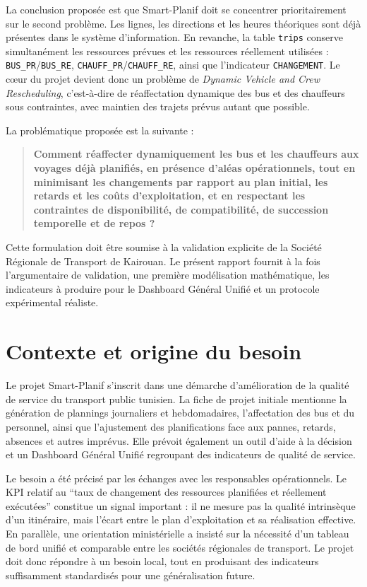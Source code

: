 \documentclass[12pt,a4paper]{article}
\newcommand{\code}[1]{\texttt{#1}}
\begin{document}
La conclusion proposée est que Smart-Planif doit se concentrer prioritairement sur le second problème. Les lignes, les directions et les heures théoriques sont déjà présentes dans le système d’information. En revanche, la table \code{trips} conserve simultanément les ressources prévues et les ressources réellement utilisées : \code{BUS\_PR}/\code{BUS\_RE}, \code{CHAUFF\_PR}/\code{CHAUFF\_RE}, ainsi que l’indicateur \code{CHANGEMENT}. Le cœur du projet devient donc un problème de \emph{Dynamic Vehicle and Crew Rescheduling}, c’est-à-dire de réaffectation dynamique des bus et des chauffeurs sous contraintes, avec maintien des trajets prévus autant que possible.

La problématique proposée est la suivante :

\begin{quote}
\textbf{Comment réaffecter dynamiquement les bus et les chauffeurs aux voyages déjà planifiés, en présence d’aléas opérationnels, tout en minimisant les changements par rapport au plan initial, les retards et les coûts d’exploitation, et en respectant les contraintes de disponibilité, de compatibilité, de succession temporelle et de repos ?}
\end{quote}

Cette formulation doit être soumise à la validation explicite de la Société Régionale de Transport de Kairouan. Le présent rapport fournit à la fois l’argumentaire de validation, une première modélisation mathématique, les indicateurs à produire pour le Dashboard Général Unifié et un protocole expérimental réaliste.

\section{Contexte et origine du besoin}

Le projet Smart-Planif s’inscrit dans une démarche d’amélioration de la qualité de service du transport public tunisien. La fiche de projet initiale mentionne la génération de plannings journaliers et hebdomadaires, l’affectation des bus et du personnel, ainsi que l’ajustement des planifications face aux pannes, retards, absences et autres imprévus. Elle prévoit également un outil d’aide à la décision et un Dashboard Général Unifié regroupant des indicateurs de qualité de service.

Le besoin a été précisé par les échanges avec les responsables opérationnels. Le KPI relatif au \enquote{taux de changement des ressources planifiées et réellement exécutées} constitue un signal important : il ne mesure pas la qualité intrinsèque d’un itinéraire, mais l’écart entre le plan d’exploitation et sa réalisation effective. En parallèle, une orientation ministérielle a insisté sur la nécessité d’un tableau de bord unifié et comparable entre les sociétés régionales de transport. Le projet doit donc répondre à un besoin local, tout en produisant des indicateurs suffisamment standardisés pour une généralisation future.
\end{document}
